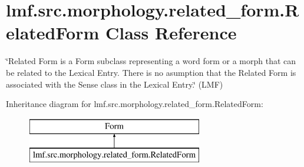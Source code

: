 \hypertarget{classlmf_1_1src_1_1morphology_1_1related__form_1_1_related_form}{\section{lmf.\+src.\+morphology.\+related\+\_\+form.\+Related\+Form Class Reference}
\label{classlmf_1_1src_1_1morphology_1_1related__form_1_1_related_form}
}


\char`\"{}\+Related Form is a Form subclass representing a word form or a morph that can be related to the Lexical Entry. There is no asumption that the Related Form is associated with the Sense class in the Lexical Entry.\char`\"{} (L\+M\+F)  


Inheritance diagram for lmf.\+src.\+morphology.\+related\+\_\+form.\+Related\+Form\+:\begin{figure}[H]
\begin{center}
\leavevmode
\includegraphics[height=2.000000cm]{classlmf_1_1src_1_1morphology_1_1related__form_1_1_related_form}
\end{center}
\end{figure}

